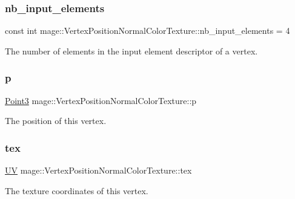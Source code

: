 \subsubsection{\texorpdfstring{nb\+\_\+input\+\_\+elements}{nb\_input\_elements}}
{\footnotesize\ttfamily const int mage\+::\+Vertex\+Position\+Normal\+Color\+Texture\+::nb\+\_\+input\+\_\+elements = 4\hspace{0.3cm}{\ttfamily [static]}}

The number of elements in the input element descriptor of a vertex. \hypertarget{structmage_1_1_vertex_position_normal_color_texture_ac7808865ca6672b7d0f4f8457077bd16}{}\label{structmage_1_1_vertex_position_normal_color_texture_ac7808865ca6672b7d0f4f8457077bd16} 
\subsubsection{\texorpdfstring{p}{p}}
{\footnotesize\ttfamily \hyperlink{structmage_1_1_point3}{Point3} mage\+::\+Vertex\+Position\+Normal\+Color\+Texture\+::p}

The position of this vertex. \hypertarget{structmage_1_1_vertex_position_normal_color_texture_a3477ce06d0778a1119cbf2e961d7c3ed}{}\label{structmage_1_1_vertex_position_normal_color_texture_a3477ce06d0778a1119cbf2e961d7c3ed} 
\subsubsection{\texorpdfstring{tex}{tex}}
{\footnotesize\ttfamily \hyperlink{structmage_1_1_u_v}{UV} mage\+::\+Vertex\+Position\+Normal\+Color\+Texture\+::tex}

The texture coordinates of this vertex. 